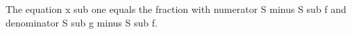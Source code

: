 The equation x sub one equals the fraction with numerator S minus S sub f and denominator S sub g minus S sub f.